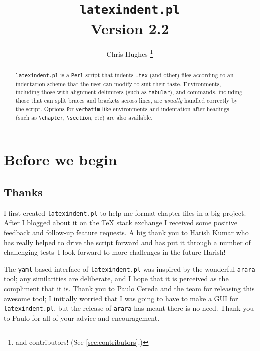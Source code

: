 \documentclass[11pt]{article}
\begin{document}
	\title{\lstinline[basicstyle=\huge\ttfamily]!latexindent.pl!\\[1cm]
		Version 2.2}
\author{Chris Hughes \footnote{and contributors! (See \vref{sec:contributors}.)}}
\maketitle
\begin{abstract}
	\lstinline!latexindent.pl! is a \lstinline!Perl! script that indents \lstinline!.tex! (and other)
	files according to an indentation scheme that the user can modify to suit their
	taste. Environments, including those with alignment delimiters (such as \lstinline!tabular!),
	and commands, including those that can split braces and brackets across lines,
	are \emph{usually} handled correctly by the script. Options for \lstinline!verbatim!-like
	environments and indentation after headings (such as \lstinline!\chapter!, \lstinline!\section!, etc)
	are also available.
\end{abstract}

\tableofcontents
\lstlistoflistings

\section{Before we begin}
\subsection{Thanks}
I first created \lstinline!latexindent.pl! to help me format chapter files
in a big project. After I blogged about it on the
\TeX{} stack exchange \cite{cmhblog} I received some positive feedback and
follow-up feature requests. A big thank you to Harish Kumar who has really
helped to drive the script forward and has put it through a number of challenging
tests--I look forward to more challenges in the future Harish!

The \lstinline!yaml!-based interface of \lstinline!latexindent.pl! was inspired
by the wonderful \lstinline!arara! tool; any similarities are deliberate, and
I hope that it is perceived as the compliment that it is. Thank you to Paulo Cereda and the
team for releasing this awesome tool; I initially worried that I was going to
have to make a GUI for \lstinline!latexindent.pl!, but the release of \lstinline!arara!
has meant there is no need. Thank you to Paulo for all of your advice and
encouragement.
\end{document}
